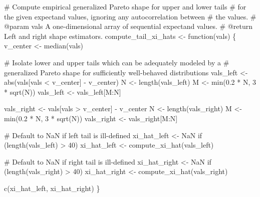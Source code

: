 \documentclass[
  letterpaper,
  DIV=11,
  numbers=noendperiod]{scrartcl}
\newenvironment{Shaded}{\begin{snugshade}}{\end{snugshade}}
\newcommand{\BuiltInTok}[1]{\textcolor[rgb]{0.00,0.23,0.31}{#1}}
\newcommand{\CommentTok}[1]{\textcolor[rgb]{0.37,0.37,0.37}{#1}}
\newcommand{\ControlFlowTok}[1]{\textcolor[rgb]{0.00,0.23,0.31}{#1}}
\newcommand{\DecValTok}[1]{\textcolor[rgb]{0.68,0.00,0.00}{#1}}
\newcommand{\FloatTok}[1]{\textcolor[rgb]{0.68,0.00,0.00}{#1}}
\newcommand{\NormalTok}[1]{\textcolor[rgb]{0.00,0.23,0.31}{#1}}
\newcommand{\OperatorTok}[1]{\textcolor[rgb]{0.37,0.37,0.37}{#1}}
\begin{document}
\begin{Shaded}
\begin{Highlighting}[]
\CommentTok{\# Compute empirical generalized Pareto shape for upper and lower tails}
\CommentTok{\# for the given expectand values, ignoring any autocorrelation between}
\CommentTok{\# the values.}
\CommentTok{\# @param vals A one{-}dimensional array of sequential expectand values.}
\CommentTok{\# @return Left and right shape estimators.}
\NormalTok{compute\_tail\_xi\_hats }\OperatorTok{\textless{}{-}}\NormalTok{ function(vals) \{}
\NormalTok{  v\_center }\OperatorTok{\textless{}{-}}\NormalTok{ median(vals)}
  
  \CommentTok{\# Isolate lower and upper tails which can be adequately modeled by a }
  \CommentTok{\# generalized Pareto shape for sufficiently well{-}behaved distributions}
\NormalTok{  vals\_left }\OperatorTok{\textless{}{-}} \BuiltInTok{abs}\NormalTok{(vals[vals }\OperatorTok{\textless{}}\NormalTok{ v\_center] }\OperatorTok{{-}}\NormalTok{ v\_center)}
\NormalTok{  N }\OperatorTok{\textless{}{-}}\NormalTok{ length(vals\_left)}
\NormalTok{  M }\OperatorTok{\textless{}{-}} \BuiltInTok{min}\NormalTok{(}\FloatTok{0.2} \OperatorTok{*}\NormalTok{ N, }\DecValTok{3} \OperatorTok{*}\NormalTok{ sqrt(N))}
\NormalTok{  vals\_left }\OperatorTok{\textless{}{-}}\NormalTok{ vals\_left[M:N]}
  
\NormalTok{  vals\_right }\OperatorTok{\textless{}{-}}\NormalTok{ vals[vals }\OperatorTok{\textgreater{}}\NormalTok{ v\_center] }\OperatorTok{{-}}\NormalTok{ v\_center}
\NormalTok{  N }\OperatorTok{\textless{}{-}}\NormalTok{ length(vals\_right)}
\NormalTok{  M }\OperatorTok{\textless{}{-}} \BuiltInTok{min}\NormalTok{(}\FloatTok{0.2} \OperatorTok{*}\NormalTok{ N, }\DecValTok{3} \OperatorTok{*}\NormalTok{ sqrt(N))}
\NormalTok{  vals\_right }\OperatorTok{\textless{}{-}}\NormalTok{ vals\_right[M:N]}
  
  \CommentTok{\# Default to NaN if left tail is ill{-}defined}
\NormalTok{  xi\_hat\_left }\OperatorTok{\textless{}{-}}\NormalTok{ NaN}
  \ControlFlowTok{if}\NormalTok{ (length(vals\_left) }\OperatorTok{\textgreater{}} \DecValTok{40}\NormalTok{)}
\NormalTok{    xi\_hat\_left }\OperatorTok{\textless{}{-}}\NormalTok{ compute\_xi\_hat(vals\_left)}

  \CommentTok{\# Default to NaN if right tail is ill{-}defined}
\NormalTok{  xi\_hat\_right }\OperatorTok{\textless{}{-}}\NormalTok{ NaN}
  \ControlFlowTok{if}\NormalTok{ (length(vals\_right) }\OperatorTok{\textgreater{}} \DecValTok{40}\NormalTok{)}
\NormalTok{    xi\_hat\_right }\OperatorTok{\textless{}{-}}\NormalTok{ compute\_xi\_hat(vals\_right)}

\NormalTok{  c(xi\_hat\_left, xi\_hat\_right)}
\NormalTok{\}}
\end{Highlighting}
\end{Shaded}
\end{document}
